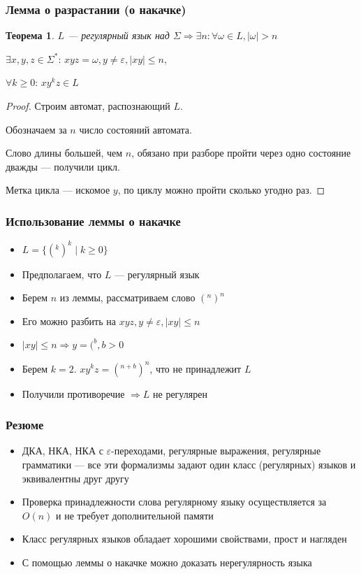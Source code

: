 \documentclass{beamer}
\newtheorem{rutheorem}{Теорема}
\begin{document}
\begin{frame}[fragile]
  \transwipe[direction=90]
  \frametitle{Лемма о разрастании (о накачке)}
  \begin{rutheorem}
  $L$ --- регулярный язык над $\Sigma \Rightarrow \exists n: \forall \omega \in L, | \omega | > n$
  
    $\exists x, y, z \in \Sigma^*: \, xyz = \omega, y \neq \varepsilon, |xy| \leq n,$
    
     $ \forall k \geq 0: \, x y^k z \in L$
  \end{rutheorem}
  
  \begin{proof}
  Строим автомат, распознающий $L$.
  
  Обозначаем за $n$ число состояний автомата.
  
  Слово длины большей, чем $n$, обязано при разборе пройти через одно состояние дважды --- получили цикл. 

  Метка цикла --- искомое $y$, по циклу можно пройти сколько угодно раз.
  
  \end{proof}

\end{frame}


\begin{frame}[fragile]
  \transwipe[direction=90]
  \frametitle{Использование леммы о накачке}
  \begin{itemize}
    \item $L = \{ (^k )^k \mid k \geq 0\} $
    \item Предполагаем, что $L$ --- регулярный язык
    \item Берем $n$ из леммы, рассматриваем слово $(^n )^n$ 
    \item Его можно разбить на $xyz, y \neq \varepsilon, |xy| \leq n$
    \item $|xy| \leq n \Rightarrow y = (^b, b > 0$
    \item Берем $k = 2$. $xy^kz = (^{n+b} )^n$, что не принадлежит $L$
    \item Получили противоречие $\Rightarrow L$  не регулярен
  \end{itemize}
  
\end{frame}


\begin{frame}[fragile]
  \transwipe[direction=90]
  \frametitle{Резюме}
  \begin{itemize}
    \item ДКА, НКА, НКА с $\varepsilon$-переходами, регулярные выражения, регулярные грамматики --- все эти формализмы задают один класс (регулярных) языков и эквивалентны друг другу
    \item Проверка принадлежности слова регулярному языку осуществляется за $O(n)$ и не требует дополнительной памяти
    \item Класс регулярных языков обладает хорошими свойствами, прост и нагляден
    \item С помощью леммы о накачке можно доказать нерегулярность языка
  \end{itemize}
  
\end{frame}
\end{document}
